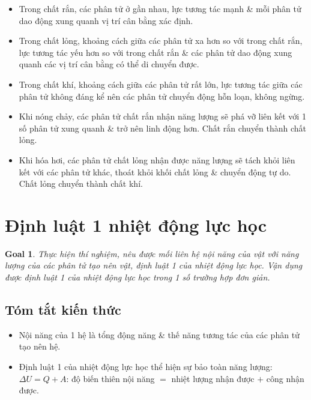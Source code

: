 \documentclass{article}
\newtheorem{goal}{Goal}
\begin{document}
\begin{itemize}
	\item Trong chất rắn, các phân tử ở gần nhau, lực tương tác mạnh \& mỗi phân tử dao động xung quanh vị trí cân bằng xác định.
	\item Trong chất lỏng, khoảng cách giữa các phân tử xa hơn so với trong chất rắn, lực tương tác yếu hơn so với trong chất rắn \& các phân tử dao động xung quanh các vị trí cân bằng có thể di chuyển được.
	\item Trong chất khí, khoảng cách giữa các phân tử rất lớn, lực tương tác giữa các phân tử không đáng kể nên các phân tử chuyển động hỗn loạn, không ngừng.
	\item Khi nóng chảy, các phân tử chất rắn nhận năng lượng sẽ phá vỡ liên kết với 1 số phân tử xung quanh \& trở nên linh động hơn. Chất rắn chuyển thành chất lỏng.
	\item Khi hóa hơi, các phân tử chất lỏng nhận được năng lượng sẽ tách khỏi liên kết với các phân tử khác, thoát khỏi khối chất lỏng \& chuyển động tự do. Chất lỏng chuyển thành chất khí.
\end{itemize}


\section{Định luật 1 nhiệt động lực học}

\begin{goal}
	Thực hiện thí nghiệm, nêu được mối liên hệ nội năng của vật với năng lượng của các phân tử tạo nên vật, định luật 1 của nhiệt động lực học. Vận dụng được định luật 1 của nhiệt động lực học trong 1 số trường hợp đơn giản.
\end{goal}

\subsection{Tóm tắt kiến thức}

\begin{itemize}
	\item Nội năng của 1 hệ là tổng động năng \& thế năng tương tác của các phân tử tạo nên hệ.
	\item Định luật 1 của nhiệt động lực học thể hiện sự bảo toàn năng lượng: $\Delta U = Q + A$: độ biến thiên nội năng $=$ nhiệt lượng nhận được $+$ công nhận được.
\end{itemize}
\end{document}
